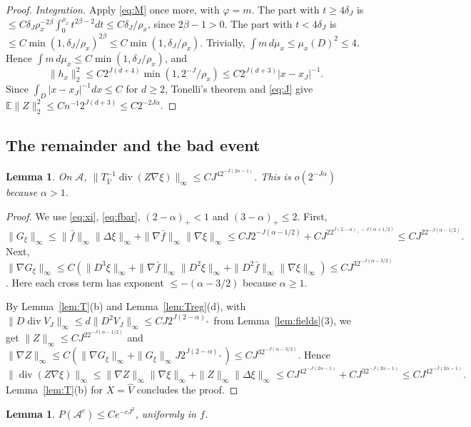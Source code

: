 \documentclass[11pt]{article}
\newtheorem{lemma}[theorem]{Lemma}
\theoremstyle{definition}
\theoremstyle{remark}
\newcommand{\E}{\mathbb E}
\newcommand{\dv}{\operatorname{div}}
\newcommand{\cA}{\mathcal A}
\begin{document}
\begin{proof}
\emph{Integration.} Apply \eqref{eq:M} once more, with $\varphi=m$. The part with $t\ge4\delta_J$ is
$\le C\delta_J\rho_x^{-2\beta}\int_0^{\rho_x}t^{2\beta-2}dt\le C\delta_J/\rho_x$, since $2\beta-1>0$.
The part with $t<4\delta_J$ is $\le C\min(1,\delta_J/\rho_x)^{2\beta}\le C\min(1,\delta_J/\rho_x)$. Trivially, $\int m\,d\mu_x\le\mu_x(D)^2\le4$. Hence $\int m\,d\mu_x\le C\min(1,\delta_J/\rho_x)$, and
\[
\|h_x\|_2^2\le C2^{J(d+4)}\min(1,2^{-J}/\rho_x)\le C2^{J(d+3)}|x-x_J|^{-1}.
\]
Since $\int_D|x-x_J|^{-1}dx\le C$ for $d\ge2$, Tonelli's theorem and \eqref{eq:J} give $\E\|Z\|_2^2\le Cn^{-1}2^{J(d+3)}\le C2^{-2J\alpha}$.
\end{proof}

\subsection{The remainder and the bad event}

\begin{lemma}\label{lem:rem}
On $\cA$, $\|T^{-1}_{\hat V}\dv(Z\nabla\xi)\|_\infty\le CJ^42^{-J(2\alpha-1)}$. This is $o(2^{-J\alpha})$ because $\alpha>1$.
\end{lemma}

\begin{proof}
We use \eqref{eq:xi}, \eqref{eq:fbar}, $(2-\alpha)_+<1$ and $(3-\alpha)_+\le2$. First,
\[
\|G_\xi\|_\infty\le\|\bar f\|_\infty\|\Delta\xi\|_\infty+\|\nabla\bar f\|_\infty\|\nabla\xi\|_\infty\le CJ2^{-J(\alpha-1/2)}+CJ^22^{J(2-\alpha)_+-J(\alpha+1/2)}\le CJ^22^{-J(\alpha-1/2)} .
\]
Next, $\|\nabla G_\xi\|_\infty\le C(\|D^3\xi\|_\infty+\|\nabla\bar f\|_\infty\|D^2\xi\|_\infty+\|D^2\bar f\|_\infty\|\nabla\xi\|_\infty)\le CJ^32^{-J(\alpha-3/2)}$. Here each cross term has exponent $\le-(\alpha-3/2)$ because $\alpha\ge1$.

By Lemma~\ref{lem:T}(b) and Lemma~\ref{lem:Treg}(d), with $\|D\dv V_J\|_\infty\le d\|D^2V_J\|_\infty\le CJ2^{J(2-\alpha)_+}$ from Lemma~\ref{lem:fields}(3), we get
$\|Z\|_\infty\le CJ^22^{-J(\alpha-1/2)}$ and
$\|\nabla Z\|_\infty\le C(\|\nabla G_\xi\|_\infty+\|G_\xi\|_\infty J2^{J(2-\alpha)_+})\le CJ^32^{-J(\alpha-3/2)}$.
Hence
\[
\|\dv(Z\nabla\xi)\|_\infty\le\|\nabla Z\|_\infty\|\nabla\xi\|_\infty+\|Z\|_\infty\|\Delta\xi\|_\infty\le CJ^42^{-J(2\alpha-1)}+CJ^32^{-J(2\alpha-1)}\le CJ^42^{-J(2\alpha-1)} .
\]
Lemma~\ref{lem:T}(b) for $X=\hat V$ concludes the proof.
\end{proof}

\begin{lemma}\label{lem:bad}
$P(\cA^c)\le Ce^{-cJ^2}$, uniformly in $f$.
\end{lemma}
\end{document}
